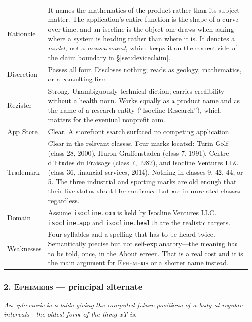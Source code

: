 \documentclass[11pt,a4paper]{article}
\newcommand{\bad}[1]{\obs{#1}}
\newcommand{\good}[1]{#1}
\newcommand{\mixed}[1]{\textcolor{mid}{#1}}
\newcommand{\code}[1]{\texttt{\small #1}}
\newcommand{\name}[1]{\textsc{#1}}
\begin{document}
\begin{longtable}{@{}L{3.0cm}L{12.1cm}@{}}
\toprule
\endhead
Rationale &
It names the mathematics of the product rather than its subject
matter. The application's entire function is the shape of a curve over
time, and an isocline is the object one draws when asking where a
system is heading rather than where it is. It denotes a \emph{model},
not a \emph{measurement}, which keeps it on the correct side of the
claim boundary in \S\ref{sec:deviceclaim}. \\[0.35em]
Discretion & \good{Passes all four.} Discloses nothing; reads as
geology, mathematics, or a consulting firm. \\[0.35em]
Register & \good{Strong.} Unambiguously technical diction; carries
credibility without a health noun. Works equally as a product name and
as the name of a research entity (``Isocline Research''), which matters
for the eventual nonprofit arm. \\[0.35em]
App Store & \good{Clear.} A storefront search surfaced no competing
application. \\[0.35em]
Trademark & \good{Clear in the relevant classes.} Four marks located:
Turin Golf (class 28, 2000), Huron Graffenstaden (class 7, 1991),
Centre d'Etudes du Fraisage (class 7, 1982), and Isocline Ventures LLC
(class 36, financial services, 2014). \good{Nothing in classes 9, 42,
44, or 5.} The three industrial and sporting marks are old enough that
their live status should be confirmed but are in unrelated classes
regardless. \\[0.35em]
Domain & \mixed{Assume \code{isocline.com} is held} by Isocline
Ventures LLC. \code{isocline.app} and \code{isocline.health} are the
realistic targets. \bad{Unverified---check at a registrar.} \\[0.35em]
Weaknesses & Four syllables and a spelling that has to be heard twice.
Semantically precise but not self-explanatory---the meaning has to be
told, once, in the About screen. That is a real cost and it is the main
argument for \name{Ephemeris} or a shorter name instead. \\
\bottomrule
\end{longtable}

\subsubsection*{2. \name{Ephemeris} --- principal alternate}

\emph{An ephemeris is a table giving the computed future positions of a
body at regular intervals---the oldest form of the thing xT is.}
\end{document}
